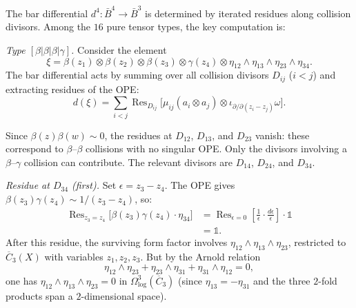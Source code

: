 \begin{computation}
\label{comp:betagamma-degree4}
The bar differential $d^4: \bar{B}^4 \to \bar{B}^3$ is determined by
iterated residues along collision divisors.  Among the $16$ pure tensor
types, the key computation is:

\emph{Type $[\beta|\beta|\beta|\gamma]$.}
Consider the element
\begin{equation}\label{eq:bbbg-element}
\xi = \beta(z_1) \otimes \beta(z_2) \otimes \beta(z_3) \otimes
\gamma(z_4) \otimes \eta_{12} \wedge \eta_{13} \wedge \eta_{23}
\wedge \eta_{34}.
\end{equation}
The bar differential acts by summing over all collision divisors $D_{ij}$
($i < j$) and extracting residues of the OPE:
\begin{equation}\label{eq:bbbg-differential}
d(\xi) = \sum_{i < j} \operatorname{Res}_{D_{ij}}
\bigl[\mu_{ij}(a_i \otimes a_j) \otimes
\iota_{\partial/\partial(z_i - z_j)}\omega\bigr].
\end{equation}

Since $\beta(z)\beta(w) \sim 0$, the residues at $D_{12}$, $D_{13}$,
and $D_{23}$ vanish: these correspond to $\beta$--$\beta$ collisions
with no singular OPE.  Only the divisors involving a $\beta$--$\gamma$
collision can contribute.  The relevant divisors are $D_{14}$, $D_{24}$,
and $D_{34}$.

\emph{Residue at $D_{34}$ (first).}
Set $\epsilon = z_3 - z_4$.  The OPE gives
$\beta(z_3)\gamma(z_4) \sim 1/(z_3 - z_4)$, so:
\begin{align*}
\operatorname{Res}_{z_3 = z_4}
\bigl[\beta(z_3)\gamma(z_4) \cdot \eta_{34}\bigr]
&= \operatorname{Res}_{\epsilon = 0}
\left[\frac{1}{\epsilon} \cdot \frac{d\epsilon}{\epsilon}\right]
\cdot \mathbb{1} \\
&= \mathbb{1}.
\end{align*}
After this residue, the surviving form factor involves
$\eta_{12} \wedge \eta_{13} \wedge \eta_{23}$, restricted to
$\overline{C}_3(X)$ with variables $z_1, z_2, z_3$.  But by the
Arnold relation
\begin{equation}\label{eq:arnold-3pt-recall}
\eta_{12} \wedge \eta_{23} + \eta_{23} \wedge \eta_{31}
+ \eta_{31} \wedge \eta_{12} = 0,
\end{equation}
one has $\eta_{12} \wedge \eta_{13} \wedge \eta_{23} = 0$ in
$\Omega^3_{\log}(\overline{C}_3)$ (since $\eta_{13} = -\eta_{31}$
and the three $2$-fold products span a $2$-dimensional space).


\end{computation}
